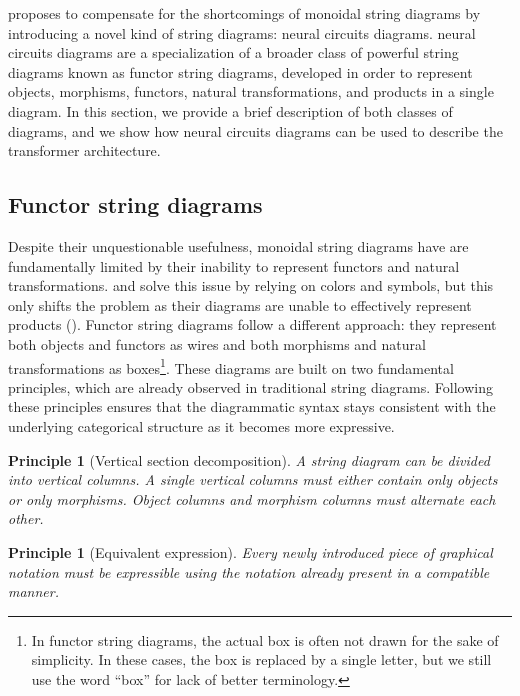 \documentclass[11pt,a4paper,openright,twoside]{report}
\newcounter{mycounter}
\theoremstyle{plain}
\newtheorem{principle}[mycounter]{Principle}
\theoremstyle{definition}
\newcommand\dblquote[1]{\textquotedblleft #1\textquotedblright}
\begin{document}
\cite{abbott2023robust} proposes to compensate for the shortcomings of monoidal string diagrams by introducing a novel kind of string diagrams: neural circuits diagrams. neural circuits diagrams are a specialization of a broader class of powerful string diagrams known as functor string diagrams, developed in order to represent objects, morphisms, functors, natural transformations, and products in a single diagram. In this section, we provide a brief description of both classes of diagrams, and we show how neural circuits diagrams can be used to describe the transformer architecture.

\subsection{Functor string diagrams}

Despite their unquestionable usefulness, monoidal string diagrams have are fundamentally limited by their inability to represent functors and natural transformations. \cite{marsden2014category} and \cite{nakahira2023diagrammatic} solve this issue by relying on colors and symbols, but this only shifts the problem as their diagrams are unable to effectively represent products (\cite{abbott2024functor}). Functor string diagrams follow a different approach: they represent both objects and functors as wires and both morphisms and natural transformations as boxes\footnote{In functor string diagrams, the actual box is often not drawn for the sake of simplicity. In these cases, the box is replaced by a single letter, but we still use the word \dblquote{box} for lack of better terminology.}. These diagrams are built on two fundamental principles, which are already observed in traditional string diagrams. Following these principles ensures that the diagrammatic syntax stays consistent with the underlying categorical structure as it becomes more expressive. 

\begin{principle}[Vertical section decomposition]
  A string diagram can be divided into vertical columns. A single vertical columns must either contain only objects or only morphisms. Object columns and morphism columns must alternate each other.
\end{principle}

\begin{principle}[Equivalent expression]
  Every newly introduced piece of graphical notation must be expressible using the notation already present in a compatible manner.
\end{principle}
\end{document}
